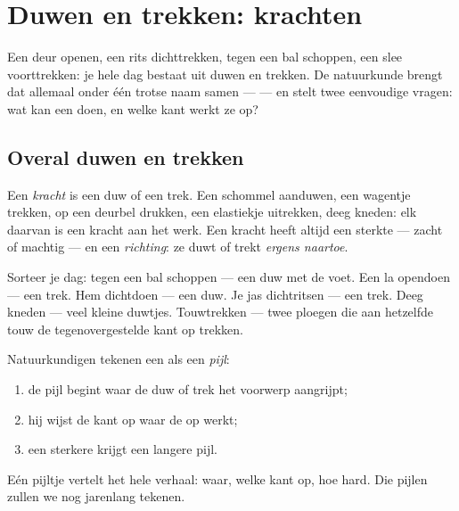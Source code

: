\chapter{Duwen en trekken: krachten}\label{ch:g2:pushes-and-pulls}

Een deur openen, een rits dichttrekken, tegen een bal schoppen, een
slee voorttrekken: je hele dag bestaat uit duwen en trekken. De
natuurkunde brengt dat allemaal onder één trotse naam samen ---
 --- en stelt twee eenvoudige vragen: wat kan een  doen,
en welke kant werkt ze op?

\section{Overal duwen en trekken}

\begin{definition}[Kracht]\label{def:g2:pushes-and-pulls:force}
Een \emph{kracht} is een duw of een trek. Een schommel
aanduwen, een wagentje trekken, op een deurbel drukken, een elastiekje
uitrekken, deeg kneden: elk daarvan is een kracht aan het werk. Een
kracht heeft altijd een sterkte --- zacht of machtig --- en een
\emph{richting}: ze duwt of trekt \emph{ergens naartoe}.
\end{definition}

\begin{example}\label{ex:g2:pushes-and-pulls:sort}
Sorteer je dag: tegen een bal schoppen --- een duw met de voet. Een la
opendoen --- een trek. Hem dichtdoen --- een duw. Je jas dichtritsen
--- een trek. Deeg kneden --- veel kleine duwtjes. Touwtrekken ---
twee ploegen die aan hetzelfde touw de tegenovergestelde kant op
trekken.
\end{example}

\begin{method}\label{met:g2:pushes-and-pulls:arrow}
Natuurkundigen tekenen een  als een \emph{pijl}:
\begin{enumerate}
  \item de pijl begint waar de duw of trek het voorwerp aangrijpt;
  \item hij wijst de kant op waar de  op werkt;
  \item een sterkere  krijgt een langere pijl.
\end{enumerate}
Eén pijltje vertelt het hele verhaal: waar, welke kant op, hoe hard.
Die pijlen zullen we nog jarenlang tekenen.
\end{method}

